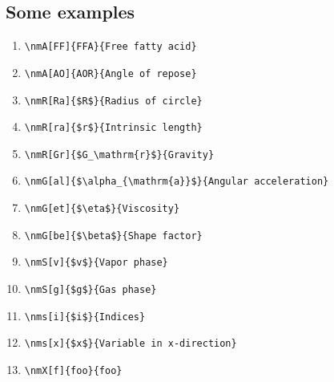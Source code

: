 \subsection{Some examples}
\begin{enumerate}
\item \verb|\nmA[FF]{FFA}{Free fatty acid}|
\item \verb|\nmA[AO]{AOR}{Angle of repose}|
\item \verb|\nmR[Ra]{$R$}{Radius of circle}|
\item \verb|\nmR[ra]{$r$}{Intrinsic length}|
\item \verb|\nmR[Gr]{$G_\mathrm{r}$}{Gravity}|
\item \verb|\nmG[al]{$\alpha_{\mathrm{a}}$}{Angular acceleration}|
\item \verb|\nmG[et]{$\eta$}{Viscosity}|
\item \verb|\nmG[be]{$\beta$}{Shape factor}|
\item \verb|\nmS[v]{$v$}{Vapor phase}|
\item \verb|\nmS[g]{$g$}{Gas phase}|
\item \verb|\nms[i]{$i$}{Indices}|
\item \verb|\nms[x]{$x$}{Variable in x-direction}|
\item \verb|\nmX[f]{foo}{foo}|
\end{enumerate} 















